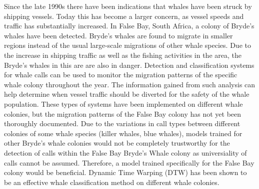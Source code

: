 \label{chap:background}

\label{sec:background-overview}
Since the late 1990s there have been indications that whales have been struck by shipping vessels.\cite{vessel_collision_since_1990s} 
Today this has become a larger concern, as vessel speeds and traffic has substantially increased.  
In False Bay, South Africa, a colony of Bryde's whales have been detected. Bryde's whales are found to migrate in smaller regions 
instead of the usual large-scale migrations of other whale species. Due to the increase in shipping traffic as well as the fishing 
activities in the area, the Bryde's whales in this are are also in danger.\cite{bryde_whales_SA}
Detection and classification systems for whale calls can be used to monitor the migration patterns of the specific whale colony throughout 
the year. The information gained from such analysis can help determine when vessel traffic should be diverted for the safety of the whale population.
These types of systems have been implemented on different whale colonies, but the migration patterns of the False Bay colony has not yet been 
thoroughly documented.\cite{reducing_vessel_collisions} 
Due to the variations in call types between different colonies of some whale species (killer whales\cite{killer_whale_dialects}, blue 
whales\cite{blue_whale_song_variation}), models trained for other Bryde's whale colonies would not be completely trustworthy for the detection of 
calls within the False Bay Bryde's Whale colony as universiality of calls cannot be assumed. Therefore, a model trained specifically for the False 
Bay colony would be beneficial. Dynamic Time Warping (DTW) has been shown to be an effective whale classification method on different whale colonies.\cite{DTW_has_worked}

\label{sec:dynamic-time-warping}

\label{sec:feature-extraction-methods-background}

\label{sec:short-time-fourier-transform}

\label{sec:mel-frequency-cepstral-coefficients}

\label{sec:linear-predictive-coding}